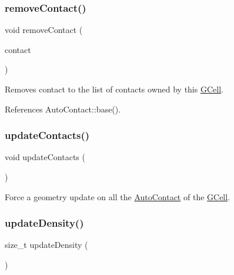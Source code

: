 \mbox{\label{classKatabatic_1_1GCell_aa052a9427fbd4185f00567a97770f80b}} 
\subsubsection{\texorpdfstring{remove\+Contact()}{removeContact()}}
{\footnotesize\ttfamily void remove\+Contact (\begin{DoxyParamCaption}\item[{\hyperlink{classKatabatic_1_1AutoContact}{Auto\+Contact} $\ast$}]{contact }\end{DoxyParamCaption})}

Removes {\ttfamily contact} to the list of contacts owned by this \hyperlink{classKatabatic_1_1GCell}{G\+Cell}. 

References Auto\+Contact\+::base().

\mbox{\label{classKatabatic_1_1GCell_aa0beea2ceaa543503346967085036d1a}} 
\subsubsection{\texorpdfstring{update\+Contacts()}{updateContacts()}}
{\footnotesize\ttfamily void update\+Contacts (\begin{DoxyParamCaption}{ }\end{DoxyParamCaption})}

Force a geometry update on all the \hyperlink{classKatabatic_1_1AutoContact}{Auto\+Contact} of the \hyperlink{classKatabatic_1_1GCell}{G\+Cell}. \mbox{\label{classKatabatic_1_1GCell_a9b3455dce10eb98d0496175dd586528c}} 
\subsubsection{\texorpdfstring{update\+Density()}{updateDensity()}}
{\footnotesize\ttfamily size\+\_\+t update\+Density (\begin{DoxyParamCaption}{ }\end{DoxyParamCaption})}

